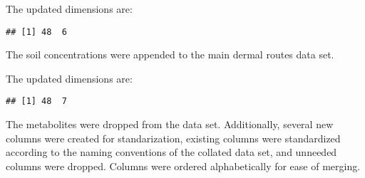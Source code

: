 \documentclass[
]{article}
\newenvironment{Shaded}{\begin{snugshade}}{\end{snugshade}}
\newcommand{\CommentTok}[1]{\textcolor[rgb]{0.56,0.35,0.01}{\textit{#1}}}
\newcommand{\DecValTok}[1]{\textcolor[rgb]{0.00,0.00,0.81}{#1}}
\newcommand{\KeywordTok}[1]{\textcolor[rgb]{0.13,0.29,0.53}{\textbf{#1}}}
\newcommand{\NormalTok}[1]{#1}
\newcommand{\OperatorTok}[1]{\textcolor[rgb]{0.81,0.36,0.00}{\textbf{#1}}}
\newcommand{\StringTok}[1]{\textcolor[rgb]{0.31,0.60,0.02}{#1}}
\begin{document}
The updated dimensions are:

\begin{verbatim}
## [1] 48  6
\end{verbatim}

The soil concentrations were appended to the main dermal routes data
set.

\begin{Shaded}
\end{Shaded}

The updated dimensions are:

\begin{verbatim}
## [1] 48  7
\end{verbatim}

The metabolites were dropped from the data set. Additionally, several
new columns were created for standarization, existing columns were
standardized according to the naming conventions of the collated data
set, and unneeded columns were dropped. Columns were ordered
alphabetically for ease of merging.
\end{document}
